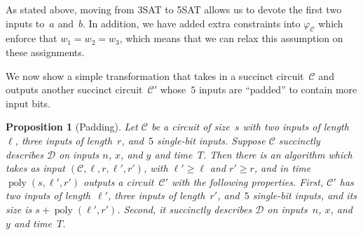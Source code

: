 \documentclass[11pt]{article}
\newtheorem{proposition}[theorem]{Proposition}
\theoremstyle{definition}
\DeclareMathOperator{\poly}{poly}
\newcommand{\decider}{\mathcal{D}}
\newcommand{\circuit}{\mathcal{C}}
\begin{document}
As stated above, moving from 3SAT to 5SAT allows us to devote the first two
inputs to~$a$ and~$b$.
In addition, we have added extra constraints into $\varphi_{\circuit}$ which
enforce that $w_1 = w_2 = w_3$, which means that we can relax this assumption on
these assignments.

We now show a simple transformation that takes in a succinct circuit~$\circuit$
and outputs another succinct circuit~$\circuit'$ whose~$5$ inputs are ``padded''
to contain more input bits.




\begin{proposition}[Padding]\label{prop:exciting-padding-prop}
  Let $\circuit$ be a circuit of size~$s$ with two inputs of length~$\ell$,
  three inputs of length~$r$, and~$5$ single-bit inputs.
  Suppose $\circuit$ succinctly describes $\decider$ on inputs $n$, $x$, and $y$
  and time~$T$.
  Then there is an algorithm which takes as input $(\circuit, \ell, r, \ell',
  r')$, with $\ell' \geq \ell$ and $r' \geq r$, and in time~$\poly(s, \ell',
  r')$ outputs a circuit~$\circuit'$ with the following properties.
  First, $\circuit'$ has two inputs of length~$\ell'$, three inputs of
  length~$r'$, and~$5$ single-bit inputs, and its size is $s + \poly(\ell',
  r')$.
  Second, it succinctly describes $\decider$ on inputs~$n$, $x$, and~$y$ and
  time~$T$.
\end{proposition}
\end{document}
